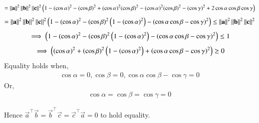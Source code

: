 \documentclass[journal,12pt,onecolumn]{IEEEtran}
\begin{document}
	 \begin{align}
		= \left\lVert\mathbf{a}\right\rVert^2 \left\lVert\mathbf{b}\right\rVert^2 \left\lVert\mathbf{c}\right\rVert^2 \left( 1 - (\cos{\alpha})^2- (\cos{\beta})^2 +(\cos{\alpha})^2(\cos{\beta})^2 -(\cos{\alpha})^2(\cos{\beta})^2  - (\cos{\gamma})^2 + 2\cos{\alpha}\cos{\beta}\cos{\gamma}\right)
\end{align}
	 \begin{align}
		= \left\lVert\mathbf{a}\right\rVert^2 \left\lVert\mathbf{b}\right\rVert^2 \left\lVert\mathbf{c}\right\rVert^2 \left( 1 - (\cos{\alpha})^2- (\cos{\beta})^2\left(1 - (\cos{\alpha})^2\right)-\left(\cos{\alpha}\cos{\beta} - \cos{\gamma}\right)^2\right)
		\leq \left\lVert\mathbf{a}\right\rVert^2 \left\lVert\mathbf{b}\right\rVert^2 \left\lVert\mathbf{c}\right\rVert^2
\end{align}
	 \begin{align}
		\implies \left( 1 - (\cos{\alpha})^2- (\cos{\beta})^2\left(1 - (\cos{\alpha})^2\right)-\left(\cos{\alpha}\cos{\beta} - \cos{\gamma}\right)^2\right) \leq 1
\end{align}
	 \begin{align}
		\implies \left( (\cos{\alpha})^2+ (\cos{\beta})^2\left(1 - (\cos{\alpha})^2\right)+\left(\cos{\alpha}\cos{\beta} - \cos{\gamma}\right)^2\right) \geq 0
\end{align}
		Equality holds when,
	 \begin{align}
\cos{\alpha} = 0, \cos{\beta} =0 , \cos{\alpha}\cos{\beta} - \cos{\gamma} = 0 
\end{align}
Or,
\begin{align}
\cos{\alpha} = \cos{\beta} = \cos{\gamma} = 0 
\end{align}

Hence $\vec{a}^\top\vec{b}=\vec{b}^\top\vec{c}=\vec{c}^\top\vec{a} = 0$ to hold equality.

		
\end{document}
